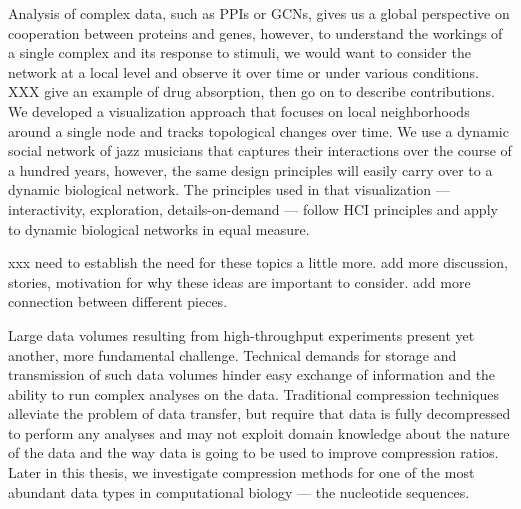 
Analysis of complex data, such as PPIs or GCNs, gives us a global perspective on cooperation between proteins and genes, however, to understand the workings of a single complex and its response to stimuli, we would want to consider the network at a local level and observe it over time or under various conditions. XXX give an example of drug absorption, then go on to describe contributions. 
We developed a visualization approach that focuses on local neighborhoods around a single node and tracks topological changes over time. We use a dynamic social network of jazz musicians that captures their interactions over the course of a hundred years, however, the same design principles will easily carry over to a dynamic biological network. The principles used in that visualization --- interactivity, exploration, details-on-demand --- follow HCI principles and apply to dynamic biological networks in equal measure.


xxx need to establish the need for these topics a little more. add more discussion, stories, motivation for why these ideas are important to consider. add more connection between different pieces.

Large data volumes resulting from high-throughput experiments present yet another, more fundamental challenge. Technical demands for storage and transmission of such data volumes hinder easy exchange of information and the ability to run complex analyses on the data. Traditional compression techniques alleviate the problem of data transfer, but require that data is fully decompressed to perform any analyses and may not exploit domain knowledge about the nature of the data and the way data is going to be used to improve compression ratios. Later in this thesis, we investigate compression methods for one of the most abundant data types in computational biology --- the nucleotide sequences.


